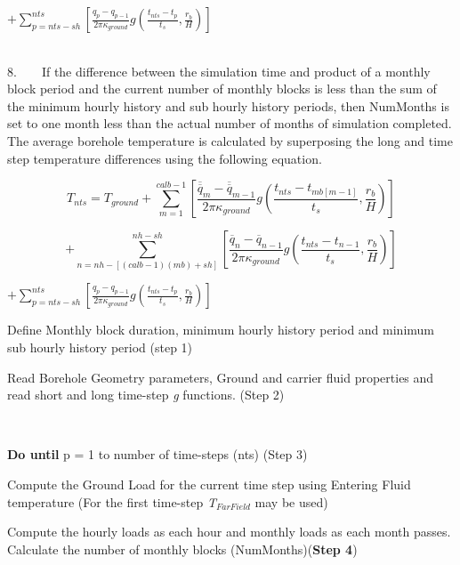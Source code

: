 \textbf{\(+ \sum\limits_{p = nts - sh}^{nts} {\left[ {\frac{{{q_p} - {q_{p - 1}}}}{{2\pi {\kappa_{ground}}}}g\left( {\frac{{{t_{nts}} - {t_p}}}{{{t_s}}},\frac{{{r_b}}}{H}} \right)} \right]}\) ~~~~~~~~~~~~~~~~~~~~~~~~~~~~~~~~~~~~~~~~~~~~~~~~~~~~~~~}

8.~~~~If the difference between the simulation time and product of a monthly block period and the current number of monthly blocks is less than the sum of the minimum hourly history and sub hourly history periods, then NumMonths is set to one month less than the actual number of months of simulation completed. The average borehole temperature is calculated by superposing the long and time step temperature differences using the following equation.

\begin{equation}
{T_{nts}} = {T_{ground}} + \sum\limits_{m = 1}^{calb - 1} {\left[ {\frac{{{{\overline{\overline q} }_m} - {{\overline{\overline q} }_{m - 1}}}}{{2\pi {\kappa_{ground}}}}g\left( {\frac{{{t_{nts}} - {t_{mb[m - 1]}}}}{{{t_s}}},\frac{{{r_b}}}{H}} \right)} \right]}
\end{equation}

\begin{equation}
+ \sum\limits_{n = nh - [(calb - 1)(mb) + sh]}^{nh - sh} {\left[ {\frac{{{{\overline q }_n} - {{\overline q }_{n - 1}}}}{{2\pi {\kappa_{ground}}}}g\left( {\frac{{{t_{nts}} - {t_{n - 1}}}}{{{t_s}}},\frac{{{r_b}}}{H}} \right)} \right]}
\end{equation}

\textbf{\(+ \sum\limits_{p = nts - sh}^{nts} {\left[ {\frac{{{q_p} - {q_{p - 1}}}}{{2\pi {\kappa_{ground}}}}g\left( {\frac{{{t_{nts}} - {t_p}}}{{{t_s}}},\frac{{{r_b}}}{H}} \right)} \right]}\) ~~~~~~~~~~~~~~~~~~~~~~~~~~}

Define Monthly block duration, minimum hourly history period and minimum sub hourly history period (step 1)

Read Borehole Geometry parameters, Ground and carrier fluid properties and read short and long time-step \emph{g} functions. (Step 2)

\textbf{~}

\textbf{Do until} p = 1 to number of time-steps (nts) (Step 3)

Compute the Ground Load for the current time step using Entering Fluid temperature (For the first time-step \emph{T}\(_{FarField}\) may be used)

Compute the hourly loads as each hour and monthly loads as each month passes. Calculate the number of monthly blocks (NumMonths)(\textbf{Step 4})


